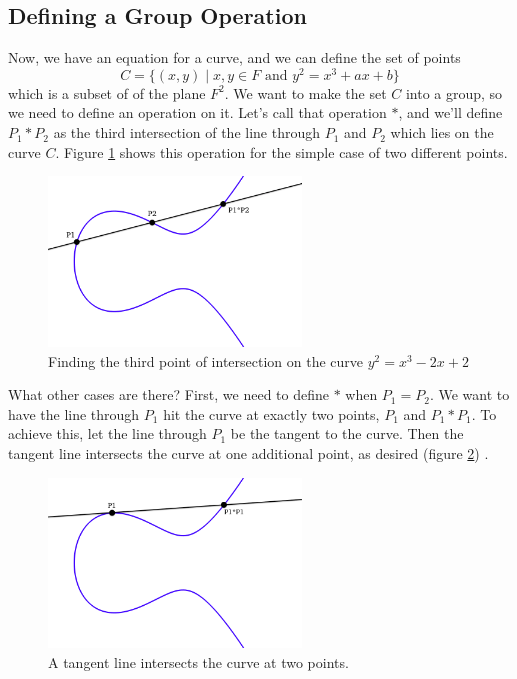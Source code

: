 \documentclass{article}
\begin{document}
\subsection{Defining a Group Operation}
Now, we have an equation for a curve, and we can define the set of points 
$$C = \{(x,y) \mid x,y \in F \text{ and } y^2 = x^3 + ax + b\}$$
which is a subset of of the plane $F^2$.
We want to make the set $C$ into a group, so we need to define an operation on it.
Let's call that operation $*$, and we'll define $P_1 * P_2$ as the third intersection of the line through $P_1$ and $P_2$ which lies on the curve $C$.
Figure \ref{fig:ec-3rd-intersection} shows this operation for the simple case of two different points.

\begin{figure}[h]
\centering
\includegraphics[width=0.6\textwidth]{images/ec4-star.png}
\caption{Finding the third point of intersection on the curve $y^2 = x^3 - 2x + 2$}
\label{fig:ec-3rd-intersection}
\end{figure}

What other cases are there?
First, we need to define $*$ when $P_1 = P_2$.
We want to have the line through $P_1$ hit the curve at exactly two points, $P_1$ and $P_1*P_1$.
To achieve this, let the line through $P_1$ be the tangent to the curve.
Then the tangent line intersects the curve at one additional point, as desired (figure \ref{fig:ec-tangent}) \cite[$\S$I.2]{rational-points}.

\begin{figure}[h]
\centering
\includegraphics[width=0.6\textwidth]{images/ec4-tangent.png}
\caption{A tangent line intersects the curve at two points.}
\label{fig:ec-tangent}
\end{figure}
\end{document}
